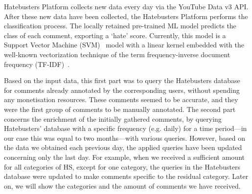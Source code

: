 \documentclass[sigconf]{acmart}
\begin{document}
Hatebusters Platform collects new data every day via the YouTube Data v3 API. After these new data have been collected, the Hatebusters Platform performs the classification process. The locally retained pre-trained ML model predicts the class of each comment, exporting a `hate' score. Currently, this model is a Support Vector Machine (SVM)~\cite{SVM} model with a linear kernel embedded with the well-known vectorization technique of the term frequency-inverse document frequency (TF-IDF)~\cite{TFIDFVec}.

Based on the input data, this first part was to query the Hatebusters database for comments already annotated by the corresponding users, without spending any monetisation resources. These comments seemed to be accurate, and they were the first group of comments to be manually annotated. The second part concerns the enrichment of the initially gathered comments, by querying Hatebusters' database with a specific frequency (e.g. daily) for a time period---in our case this was equal to two months---with various queries. However, based on the data we obtained each previous day, the applied queries have been updated concerning only the last day. For example, when we received a sufficient amount for all categories of HS, except for one category, the queries in the Hatebusters database were updated to make comments specific to the residual category. Later on, we will show the categories and the amount of comments we have received.

\iffalse
\begin{figure}[ht]
\centering
\begin{BVerbatim}
SELECT text
FROM comment
WHERE date >= `2019-04-20'
\end{BVerbatim}
\caption{Collecting every new comment.}
\label{fig:easySQL}
\end{figure}

\begin{figure}[ht]
\centering
\begin{BVerbatim}
SELECT text
FROM comment 
  inner join comment_interests on 
  comment.id = comment_interests.cid
  inner join interest on 
  comment_interests.iid = interests.id
WHERE date >= `2019-04-20' 
  AND ( inter = `disabled' )
\end{BVerbatim}
\caption{Collecting new comments from specific categories.}
\label{fig:neasySQL}
\end{figure}
\fi
\end{document}
